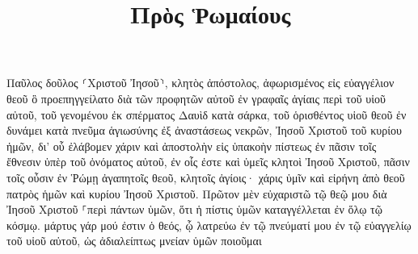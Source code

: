 \documentclass{openreader}
\title{Πρὸς Ῥωμαίους}
\date{}
\begin{document}
\maketitle
\raggedbottom 
\fontsize{16pt}{24pt}\selectfont


Παῦλος δοῦλος ⸂Χριστοῦ Ἰησοῦ⸃, κλητὸς ἀπόστολος, ἀφωρισμένος εἰς εὐαγγέλιον θεοῦ 
ὃ προεπηγγείλατο διὰ τῶν προφητῶν αὐτοῦ ἐν γραφαῖς ἁγίαις 
περὶ τοῦ υἱοῦ αὐτοῦ, τοῦ γενομένου ἐκ σπέρματος Δαυὶδ κατὰ σάρκα, 
τοῦ ὁρισθέντος υἱοῦ θεοῦ ἐν δυνάμει κατὰ πνεῦμα ἁγιωσύνης ἐξ ἀναστάσεως νεκρῶν, Ἰησοῦ Χριστοῦ τοῦ κυρίου ἡμῶν, 
δι’ οὗ ἐλάβομεν χάριν καὶ ἀποστολὴν εἰς ὑπακοὴν πίστεως ἐν πᾶσιν τοῖς ἔθνεσιν ὑπὲρ τοῦ ὀνόματος αὐτοῦ, 
ἐν οἷς ἐστε καὶ ὑμεῖς κλητοὶ Ἰησοῦ Χριστοῦ, 
πᾶσιν τοῖς οὖσιν ἐν Ῥώμῃ ἀγαπητοῖς θεοῦ, κλητοῖς ἁγίοις· χάρις ὑμῖν καὶ εἰρήνη ἀπὸ θεοῦ πατρὸς ἡμῶν καὶ κυρίου Ἰησοῦ Χριστοῦ. 
Πρῶτον μὲν εὐχαριστῶ τῷ θεῷ μου διὰ Ἰησοῦ Χριστοῦ ⸀περὶ πάντων ὑμῶν, ὅτι ἡ πίστις ὑμῶν καταγγέλλεται ἐν ὅλῳ τῷ κόσμῳ. 
μάρτυς γάρ μού ἐστιν ὁ θεός, ᾧ λατρεύω ἐν τῷ πνεύματί μου ἐν τῷ εὐαγγελίῳ τοῦ υἱοῦ αὐτοῦ, ὡς ἀδιαλείπτως μνείαν ὑμῶν ποιοῦμαι 
\end{document}
